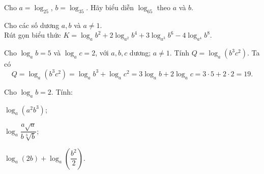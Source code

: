 \begin{ex}%
	Cho $a=\log_25$, $b=\log_35$. Hãy biểu diễn  $\log_65$ theo $a$ và $b$.
\end{ex}

\begin{ex}%
	Cho  các số dương $a,b$ và $a\neq 1$. \\Rút gọn biểu thức $K=\log_ab^2+2\log_{a^2}{b^4}+3\log_{a^3}{b^6}-4\log_{a^4}{b^8}$.
\end{ex}

\begin{bt}%
Cho $\log_ab=5$ và $\log_ac=2$, với $ a,b,c$ dương; $ a\ne 1$. Tính $ Q=\log_a\left(b^3c^2\right)$.
\loigiai
{
	Ta có $$ Q=\log_a\left(b^3c^2\right)=\log_a{b^3}+\log_a{c^2}=3\log_ab+2\log_ac=3\cdot 5+2\cdot 2=19.$$}
\end{bt}

\begin{bt}%
 
	Cho $\log _{a} b=2$. Tính:
	\begin{listEX}[3] 
		\item  $\log _{a}\left(a^{2} b^{3}\right)$;
		\item $\log _{a} \dfrac{a \sqrt{a}}{b \sqrt[3]{b}}$;
		\item $\log _{a}(2 b)+\log _{a}\left(\dfrac{b^{2}}{2}\right)$.
	\end{listEX}
\end{bt}

